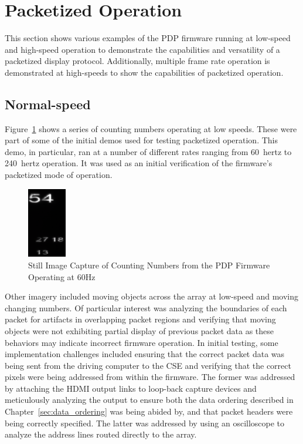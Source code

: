 \section{Packetized Operation}
        This section shows various examples of the PDP firmware running at low-speed and high-speed operation to demonstrate the capabilities and versatility of a packetized display protocol. Additionally, multiple frame rate operation is demonstrated at high-speeds to show the capabilities of packetized operation.

    \subsection{Normal-speed}
        Figure~\ref{fig:low_speed_numbers} shows a series of counting numbers operating at low speeds. These were part of some of the initial demos used for testing packetized operation. This demo, in particular, ran at a number of different rates ranging from \mbox{60 hertz} to \mbox{240 hertz} operation. It was used as an initial verification of the firmware's packetized mode of operation.

        \begin{figure}[t]
            \centering
            \includegraphics[width=0.15\textwidth]{fig/low_speed_numbers.png}
            \caption{Still Image Capture of Counting Numbers from the PDP Firmware Operating at 60Hz}
            \label{fig:low_speed_numbers}
        \end{figure}

        Other imagery included moving objects across the array at low-speed and moving changing numbers. Of particular interest was analyzing the boundaries of each packet for artifacts in overlapping packet regions and verifying that moving objects were not exhibiting partial display of previous packet data as these behaviors may indicate incorrect firmware operation. In initial testing, some implementation challenges included ensuring that the correct packet data was being sent from the driving computer to the CSE and verifying that the correct pixels were being addressed from within the firmware. The former was addressed by attaching the HDMI output links to loop-back capture devices and meticulously analyzing the output to ensure both the data ordering described in Chapter~\ref{sec:data_ordering} was being abided by, and that packet headers were being correctly specified. The latter was addressed by using an oscilloscope to analyze the address lines routed directly to the array.

